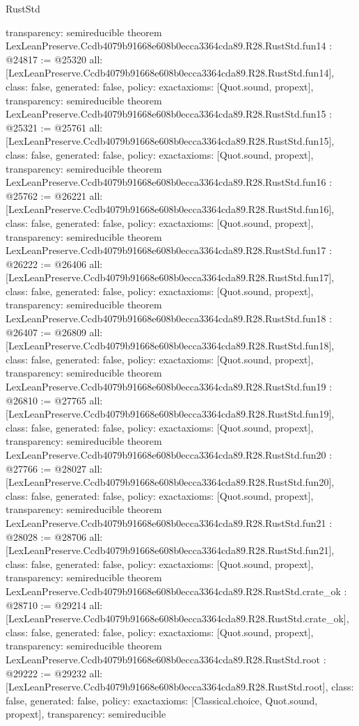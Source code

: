 \begin{lexlean}{RustStd}
\begin{coremodule}
{  transparency: semireducible
}
theorem LexLeanPreserve.Ccdb4079b91668e608b0ecca3364cda89.R28.RustStd.fun14 : @24817 := @25320 {
  all: [LexLeanPreserve.Ccdb4079b91668e608b0ecca3364cda89.R28.RustStd.fun14],
  class: false,
  generated: false,
  policy: exact{axioms: [Quot.sound, propext]},
  transparency: semireducible
}
theorem LexLeanPreserve.Ccdb4079b91668e608b0ecca3364cda89.R28.RustStd.fun15 : @25321 := @25761 {
  all: [LexLeanPreserve.Ccdb4079b91668e608b0ecca3364cda89.R28.RustStd.fun15],
  class: false,
  generated: false,
  policy: exact{axioms: [Quot.sound, propext]},
  transparency: semireducible
}
theorem LexLeanPreserve.Ccdb4079b91668e608b0ecca3364cda89.R28.RustStd.fun16 : @25762 := @26221 {
  all: [LexLeanPreserve.Ccdb4079b91668e608b0ecca3364cda89.R28.RustStd.fun16],
  class: false,
  generated: false,
  policy: exact{axioms: [Quot.sound, propext]},
  transparency: semireducible
}
theorem LexLeanPreserve.Ccdb4079b91668e608b0ecca3364cda89.R28.RustStd.fun17 : @26222 := @26406 {
  all: [LexLeanPreserve.Ccdb4079b91668e608b0ecca3364cda89.R28.RustStd.fun17],
  class: false,
  generated: false,
  policy: exact{axioms: [Quot.sound, propext]},
  transparency: semireducible
}
theorem LexLeanPreserve.Ccdb4079b91668e608b0ecca3364cda89.R28.RustStd.fun18 : @26407 := @26809 {
  all: [LexLeanPreserve.Ccdb4079b91668e608b0ecca3364cda89.R28.RustStd.fun18],
  class: false,
  generated: false,
  policy: exact{axioms: [Quot.sound, propext]},
  transparency: semireducible
}
theorem LexLeanPreserve.Ccdb4079b91668e608b0ecca3364cda89.R28.RustStd.fun19 : @26810 := @27765 {
  all: [LexLeanPreserve.Ccdb4079b91668e608b0ecca3364cda89.R28.RustStd.fun19],
  class: false,
  generated: false,
  policy: exact{axioms: [Quot.sound, propext]},
  transparency: semireducible
}
theorem LexLeanPreserve.Ccdb4079b91668e608b0ecca3364cda89.R28.RustStd.fun20 : @27766 := @28027 {
  all: [LexLeanPreserve.Ccdb4079b91668e608b0ecca3364cda89.R28.RustStd.fun20],
  class: false,
  generated: false,
  policy: exact{axioms: [Quot.sound, propext]},
  transparency: semireducible
}
theorem LexLeanPreserve.Ccdb4079b91668e608b0ecca3364cda89.R28.RustStd.fun21 : @28028 := @28706 {
  all: [LexLeanPreserve.Ccdb4079b91668e608b0ecca3364cda89.R28.RustStd.fun21],
  class: false,
  generated: false,
  policy: exact{axioms: [Quot.sound, propext]},
  transparency: semireducible
}
theorem LexLeanPreserve.Ccdb4079b91668e608b0ecca3364cda89.R28.RustStd.crate_ok : @28710 := @29214 {
  all: [LexLeanPreserve.Ccdb4079b91668e608b0ecca3364cda89.R28.RustStd.crate_ok],
  class: false,
  generated: false,
  policy: exact{axioms: [Quot.sound, propext]},
  transparency: semireducible
}
theorem LexLeanPreserve.Ccdb4079b91668e608b0ecca3364cda89.R28.RustStd.root : @29222 := @29232 {
  all: [LexLeanPreserve.Ccdb4079b91668e608b0ecca3364cda89.R28.RustStd.root],
  class: false,
  generated: false,
  policy: exact{axioms: [Classical.choice, Quot.sound, propext]},
  transparency: semireducible
}


\end{coremodule}
\end{lexlean}
